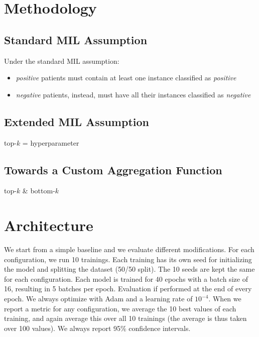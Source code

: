 \documentclass[final]{cvpr}
\begin{document}
	\section{Methodology}
	
	\subsection{Standard MIL Assumption} 
	
	Under the standard MIL assumption: 
	
	\begin{itemize}
		\setlength\itemsep{-.2em}
		\item \emph{positive} patients must contain at least one instance classified as \emph{positive}
		\item \emph{negative} patients, instead, must have all their instances classified as \emph{negative}
	\end{itemize}

	\subsection{Extended  MIL Assumption} 
	
	top-$k$ = hyperparameter

	\subsection{Towards a Custom Aggregation Function}
	
	top-$k$ \& bottom-$k$
	

	
	\section{Architecture}
	
	We start from a simple baseline and we evaluate different modifications.
	For each configuration, we run 10 trainings. Each training has its own seed for initializing the model and splitting the dataset (50/50 split). The 10 seeds are kept the same for each configuration. Each model is trained for 40 epochs with a batch size of 16, resulting in 5 batches per epoch. Evaluation if performed at the end of every epoch. We always optimize with Adam and a learning rate of $10^{-4}$. When we report a metric for any configuration, we average the 10 best values of each training, and again average this over all 10 trainings (the average is thus taken over 100 values). We always report 95\% confidence intervals.
	
\end{document}
